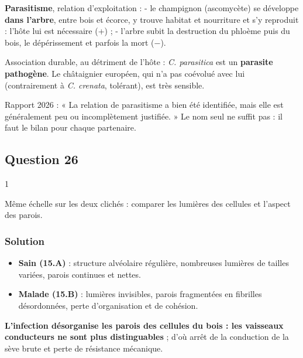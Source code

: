 \documentclass[11pt,a4paper]{article}
\providecommand{\tightlist}{\setlength{\itemsep}{0pt}\setlength{\parskip}{0pt}}
\begin{document}
\textbf{Parasitisme}, relation d'exploitation :
- le champignon (ascomycète) se développe \textbf{dans l'arbre}, entre bois et écorce, y trouve habitat et nourriture et s'y reproduit : l'hôte lui est nécessaire (+) ;
- l'arbre subit la destruction du phloème puis du bois, le dépérissement et parfois la mort (−).

Association durable, au détriment de l'hôte : \emph{C. parasitica} est un \textbf{parasite pathogène}. Le châtaignier européen, qui n'a pas coévolué avec lui (contrairement à \emph{C. crenata}, tolérant), est très sensible.

\begin{jury}

Rapport 2026 : « La relation de parasitisme a bien été identifiée, mais elle est généralement peu ou incomplètement justifiée. » Le nom seul ne suffit pas : il faut le bilan pour chaque partenaire.

\end{jury}

\hypertarget{question-26}{%
\subsection{Question 26}\label{question-26}}

\begin{indication}{1}

Même échelle sur les deux clichés : comparer les lumières des cellules et l'aspect des parois.

\end{indication}

\hypertarget{solution-25}{%
\subsubsection{Solution}\label{solution-25}}

\begin{itemize}
\tightlist
\item
  \textbf{Sain (15.A)} : structure alvéolaire régulière, nombreuses lumières de tailles variées, parois continues et nettes.
\item
  \textbf{Malade (15.B)} : lumières invisibles, parois fragmentées en fibrilles désordonnées, perte d'organisation et de cohésion.
\end{itemize}

\textbf{L'infection désorganise les parois des cellules du bois : les vaisseaux conducteurs ne sont plus distinguables} ; d'où arrêt de la conduction de la sève brute et perte de résistance mécanique.
\end{document}
